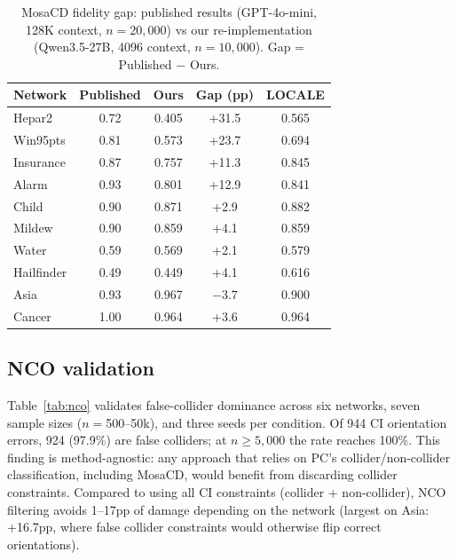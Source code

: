 \documentclass{article}
\begin{document}
\begin{table}[t]
\centering
\caption{MosaCD fidelity gap: published results (GPT-4o-mini, 128K context, $n{=}20{,}000$) vs our re-implementation (Qwen3.5-27B, 4096 context, $n{=}10{,}000$). Gap = Published $-$ Ours.}
\label{tab:fidelity}
\small
\begin{tabular}{lcccc}
\toprule
Network & Published & Ours & Gap (pp) & LOCALE \\
\midrule
Hepar2    & 0.72 & 0.405 & +31.5 & 0.565 \\
Win95pts  & 0.81 & 0.573 & +23.7 & 0.694 \\
Insurance & 0.87 & 0.757 & +11.3 & 0.845 \\
Alarm     & 0.93 & 0.801 & +12.9 & 0.841 \\
Child     & 0.90 & 0.871 & +2.9  & 0.882 \\
Mildew    & 0.90 & 0.859 & +4.1  & 0.859 \\
Water     & 0.59 & 0.569 & +2.1  & 0.579 \\
Hailfinder & 0.49 & 0.449 & +4.1 & 0.616 \\
Asia      & 0.93 & 0.967 & $-3.7$  & 0.900 \\
Cancer    & 1.00 & 0.964 & +3.6  & 0.964 \\
\bottomrule
\end{tabular}
\end{table}

\subsection{NCO validation}

Table~\ref{tab:nco} validates false-collider dominance across six networks, seven sample sizes ($n{=}$500--50k), and three seeds per condition. Of 944 CI orientation errors, 924 (97.9\%) are false colliders; at $n \geq 5{,}000$ the rate reaches 100\%. This finding is method-agnostic: any approach that relies on PC's collider/non-collider classification, including MosaCD, would benefit from discarding collider constraints. Compared to using all CI constraints (collider + non-collider), NCO filtering avoids 1--17pp of damage depending on the network (largest on Asia: +16.7pp, where false collider constraints would otherwise flip correct orientations).
\end{document}

